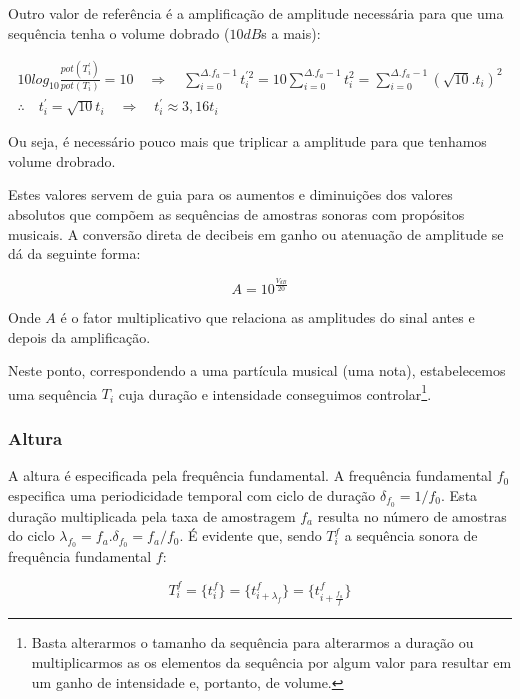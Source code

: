 Outro valor de referência é a amplificação de amplitude
necessária para que uma sequência tenha o volume dobrado ($10dB$s a mais):

\begin{gather}
10log_{10}\frac{pot(T^{'}_i)}{pot(T_i)} = 10 \quad \Rightarrow \quad \sum_{i=0}^{\Delta.f_a-1}t^{'2}_i=10\sum_{i=0}^{\Delta.f_a-1}t_i^2=\sum_{i=0}^{\Delta.f_a-1}(\sqrt{10}.t_i)^2 \\
\therefore \quad t^{'}_i=\sqrt{10}t_i \quad \Rightarrow \quad t^{'}_i \approx 3,16t_i
\end{gather}

Ou seja, é necessário pouco mais que triplicar a amplitude para que tenhamos volume drobrado.

Estes valores servem de guia para os aumentos e diminuições dos valores absolutos que compõem as
sequências de amostras sonoras com propósitos musicais. A conversão direta de decibeis
em ganho ou atenuação de amplitude se dá da seguinte forma:

\begin{equation}\label{ampDec}
A = 10^{\frac{V_{dB}}{20}}
\end{equation}

Onde $A$ é o fator multiplicativo que relaciona as amplitudes do sinal antes e depois da amplificação.

Neste ponto, correspondendo a uma partícula musical (uma nota), estabelecemos uma sequência $T_i$ cuja
duração e intensidade conseguimos controlar\footnote{Basta alterarmos o tamanho da sequência para alterarmos
a duração ou multiplicarmos as os elementos da sequência por algum valor para resultar em um ganho de intensidade e, portanto, de volume.}. 

\subsubsection{Altura}

A altura é especificada pela frequência fundamental. A frequência fundamental $f_0$ especifica uma periodicidade temporal
com ciclo de duração $\delta_{f_0} = 1/f_0$. Esta duração multiplicada pela taxa de amostragem $f_a$ resulta no número de amostras
do ciclo $\lambda_{f_0}=f_a . \delta_{f_0} =f_a/f_0$. É evidente que, sendo $T_i^f$ a sequência sonora de frequência fundamental $f$:
    
\begin{equation}\label{periodicidade}
     T^f_i=\{ t_i^f \}=\{ t^f_{i+\lambda_{f}}  \}= \{ t^f_{i+\frac{f_a}{f}} \}
\end{equation}

